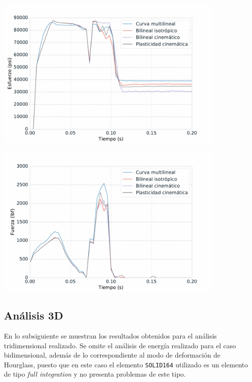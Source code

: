 \begin{center}
\includegraphics[width=0.85\textwidth]{src/ch4/mdm_von_mises.pdf}
\label{fig:mdm_von_mises}
\end{center}

\begin{center}
\includegraphics[width=0.85\textwidth]{src/ch4/mdm_force.pdf}
\label{fig:mdm_force}
\end{center}

\subsection{Análisis 3D}

En lo subsiguiente se muestran los resultados obtenidos para el análisis tridimensional 
realizado. Se omite el análisis de energía realizado para el caso bidimensional, además 
de lo correspondiente al modo de deformación de Hourglass, puesto que en este caso el 
elemento \texttt{SOLID164} utilizado es un elemento de tipo \textit{full integration} y 
no presenta problemas de este tipo.

